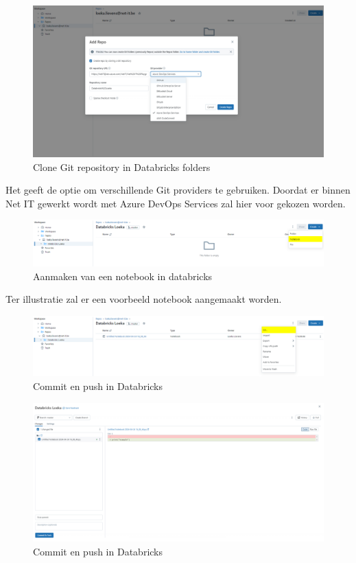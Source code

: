 \begin{figure}[H]
    \centering
    \includegraphics[width=1\textwidth]{./graphics/databricks/git_1.png}
    \caption{Clone Git repository in Databricks folders}
\end{figure}

Het geeft de optie om verschillende Git providers te gebruiken. Doordat er binnen Net IT gewerkt wordt met Azure DevOps Services zal hier voor gekozen worden.

\begin{figure}[H]
    \includegraphics[width=1\textwidth]{./graphics/databricks/git_2.png}
    \caption{Aanmaken van een notebook in databricks}
\end{figure}

Ter illustratie zal er een voorbeeld notebook aangemaakt worden.

\begin{figure}[H]
    \centering
    \includegraphics[width=1\textwidth]{./graphics/databricks/git_3.png}
    \caption{Commit en push in Databricks}
\end{figure}

\begin{figure}[H]
    \centering
    \includegraphics[width=1\textwidth]{./graphics/databricks/git_4.png}
    \caption{Commit en push in Databricks}
\end{figure}

